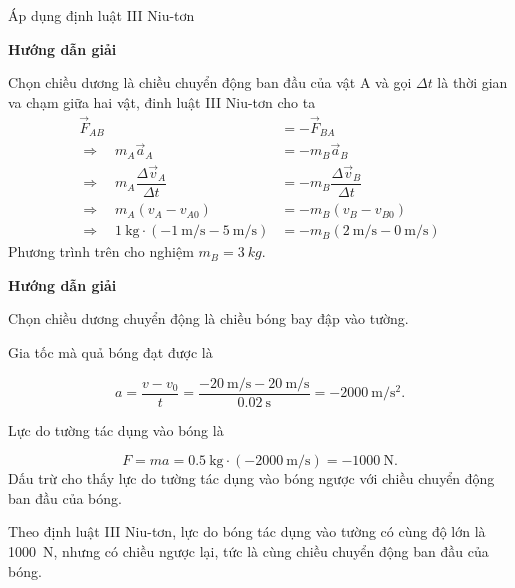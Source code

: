 \begin{dang}{Áp dụng định luật III Niu-tơn}
	{	\begin{center}
			\textbf{Hướng dẫn giải}
		\end{center}
		
		Chọn chiều dương là chiều chuyển động ban đầu của vật A và gọi $\Delta t$ là thời gian va chạm giữa hai vật, đinh luật III Niu-tơn cho ta
		\begin{align*}
			\vec{F}_{AB}&=-\vec{F}_{BA}\\
			\Rightarrow\quad m_A\vec{a}_A&=-m_B\vec{a}_B\\
			\Rightarrow\quad m_A\dfrac{\Delta \vec{v}_A}{\Delta t}&=-m_B\dfrac{\Delta\vec{v}_B}{\Delta t}\\	
			\Rightarrow\quad m_A(v_A-v_{A0})&=-m_B(v_B-v_{B0})\\
			\Rightarrow\quad \SI{1}{\kilogram}\cdot(\SI{-1}{\meter/\second}-\SI{5}{\meter/\second})&=-m_B(\SI{2}{\meter/\second}-\SI{0}{\meter/\second})		
		\end{align*}
		Phương trình trên cho nghiệm $m_B = \SI{3}{kg}.$
		
	}
	{	\begin{center}
			\textbf{Hướng dẫn giải}
		\end{center}
		
		Chọn chiều dương chuyển động là chiều bóng bay đập vào tường.
		
		Gia tốc mà quả bóng đạt được là
		
		$$a = \dfrac{v-v_0}{t}=\dfrac{-\SI{20}{\meter/\second}-\SI{20}{\meter/\second}}{\SI{0.02}{\second}} = -\SI{2000}{\meter/\second^2}.$$
		
		Lực do tường tác dụng vào bóng là
		
		$$F =ma =\SI{0.5}{\kilogram}\cdot(\SI{-2000}{\meter/\second})= -\SI{1000}{\newton}.$$
		Dấu trừ cho thấy lực do tường tác dụng vào bóng ngược với chiều chuyển động ban đầu của bóng. 
		
		Theo định luật III Niu-tơn, lực do bóng tác dụng vào tường có cùng độ lớn là \SI{1000}{\newton}, nhưng có chiều ngược lại, tức là cùng chiều chuyển động ban đầu của bóng.	
	}
	
\end{dang}
